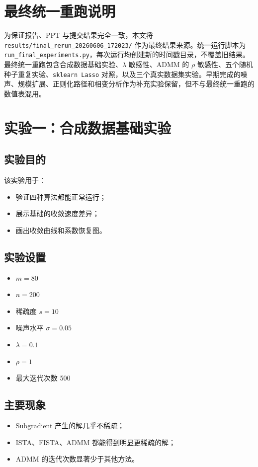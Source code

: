 \documentclass[12pt,a4paper]{ctexart}
\begin{document}
\section{最终统一重跑说明}
为保证报告、PPT 与提交结果完全一致，本文将
\texttt{results/final\_rerun\_20260606\_172023/}
作为最终结果来源。统一运行脚本为 \texttt{run\_final\_experiments.py}，每次运行均创建新的时间戳目录，不覆盖旧结果。最终统一重跑包含合成数据基础实验、$\lambda$ 敏感性、ADMM 的 $\rho$ 敏感性、五个随机种子重复实验、\texttt{sklearn Lasso} 对照，以及三个真实数据集实验。早期完成的噪声、规模扩展、正则化路径和相变分析作为补充实验保留，但不与最终统一重跑的数值表混用。

\section{实验一：合成数据基础实验}
\subsection{实验目的}
该实验用于：
\begin{itemize}[leftmargin=2em]
    \item 验证四种算法都能正常运行；
    \item 展示基础的收敛速度差异；
    \item 画出收敛曲线和系数恢复图。
\end{itemize}

\subsection{实验设置}
\begin{itemize}[leftmargin=2em]
    \item $m=80$
    \item $n=200$
    \item 稀疏度 $s=10$
    \item 噪声水平 $\sigma=0.05$
    \item $\lambda=0.1$
    \item $\rho=1$
    \item 最大迭代次数 500
\end{itemize}

\subsection{主要现象}
\begin{itemize}[leftmargin=2em]
    \item Subgradient 产生的解几乎不稀疏；
    \item ISTA、FISTA、ADMM 都能得到明显更稀疏的解；
    \item ADMM 的迭代次数显著少于其他方法。
\end{itemize}
\end{document}
